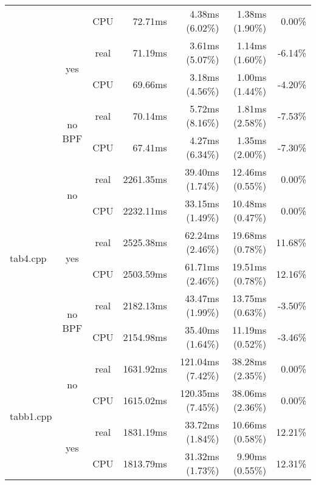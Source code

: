 \documentclass[en]{pracamgr}
\begin{document}
\begin{appendices}
\begin{small}
\begin{longtable}{|l|c|c|r|r|r|r|}
                            &                         & CPU  & 72.71ms & 4.38ms (6.02\%) & 1.38ms (1.90\%) & 0.00\% \\*
                            \cline{2-7}
                            & \multirow{2}{*}{yes}    & real & 71.19ms & 3.61ms (5.07\%) & 1.14ms (1.60\%) & -6.14\% \\*
                            &                         & CPU  & 69.66ms & 3.18ms (4.56\%) & 1.00ms (1.44\%) & -4.20\% \\*
                            \cline{2-7}
                            & \multirow{2}{*}{no BPF} & real & 70.14ms & 5.72ms (8.16\%) & 1.81ms (2.58\%) & -7.53\% \\*
                            &                         & CPU  & 67.41ms & 4.27ms (6.34\%) & 1.35ms (2.00\%) & -7.30\% \\
\hline
\multirow{6}{*}{tab4.cpp}   & \multirow{2}{*}{no}     & real & 2261.35ms & 39.40ms (1.74\%) & 12.46ms (0.55\%) & 0.00\% \\*
                            &                         & CPU  & 2232.11ms & 33.15ms (1.49\%) & 10.48ms (0.47\%) & 0.00\% \\*
                            \cline{2-7}
                            & \multirow{2}{*}{yes}    & real & 2525.38ms & 62.24ms (2.46\%) & 19.68ms (0.78\%) & 11.68\% \\*
                            &                         & CPU  & 2503.59ms & 61.71ms (2.46\%) & 19.51ms (0.78\%) & 12.16\% \\*
                            \cline{2-7}
                            & \multirow{2}{*}{no BPF} & real & 2182.13ms & 43.47ms (1.99\%) & 13.75ms (0.63\%) & -3.50\% \\*
                            &                         & CPU  & 2154.98ms & 35.40ms (1.64\%) & 11.19ms (0.52\%) & -3.46\% \\
\hline
\multirow{6}{*}{tabb1.cpp}  & \multirow{2}{*}{no}     & real & 1631.92ms & 121.04ms (7.42\%) & 38.28ms (2.35\%) & 0.00\% \\*
                            &                         & CPU  & 1615.02ms & 120.35ms (7.45\%) & 38.06ms (2.36\%) & 0.00\% \\*
                            \cline{2-7}
                            & \multirow{2}{*}{yes}    & real & 1831.19ms & 33.72ms (1.84\%) & 10.66ms (0.58\%) & 12.21\% \\*
                            &                         & CPU  & 1813.79ms & 31.32ms (1.73\%) & 9.90ms (0.55\%) & 12.31\% \\*

\end{longtable}
\end{small}
\end{appendices}
\end{document}
